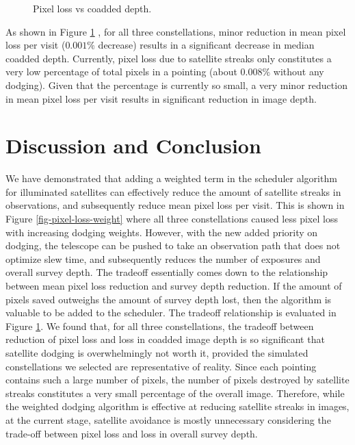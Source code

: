 \documentclass[linenumbers]{aastex631}
\begin{document}
\begin{figure}[ht!]
\caption{Pixel loss vs coadded depth. \label{fig-trade-off}}
\end{figure}

As shown in Figure \ref{fig-trade-off} , for all three constellations, minor reduction in mean pixel loss per visit
($0.001\%$ decrease) results in a significant decrease in median coadded depth. Currently, pixel
loss due to satellite streaks only constitutes a very low percentage of total pixels in a pointing
(about $0.008\%$ without any dodging). Given that the percentage is currently so small, a very
minor reduction in mean pixel loss per visit results in significant reduction in image depth.

\section{Discussion and Conclusion}

We have demonstrated that adding a weighted term in the scheduler algorithm for
illuminated satellites can effectively reduce the amount of satellite streaks in observations, and
subsequently reduce mean pixel loss per visit. This is shown in Figure \ref{fig-pixel-loss-weight} where all three
constellations caused less pixel loss with increasing dodging weights. However, with the new
added priority on dodging, the telescope can be pushed to take an observation path that does not
optimize slew time, and subsequently reduces the number of exposures and overall survey depth.
The tradeoff essentially comes down to the relationship between mean pixel loss
reduction and survey depth reduction. If the amount of pixels saved outweighs the amount of
survey depth lost, then the algorithm is valuable to be added to the scheduler. The tradeoff
relationship is evaluated in Figure \ref{fig-trade-off}. We found that, for all three constellations, the tradeoff
between reduction of pixel loss and loss in coadded image depth is so significant that satellite
dodging is overwhelmingly not worth it, provided the simulated constellations we selected are
representative of reality. Since each pointing contains such a large number of pixels, the number
of pixels destroyed by satellite streaks constitutes a very small percentage of the overall image.
Therefore, while the weighted dodging algorithm is effective at reducing satellite streaks in
images, at the current stage, satellite avoidance is mostly unnecessary considering the trade-off
between pixel loss and loss in overall survey depth.
\end{document}
